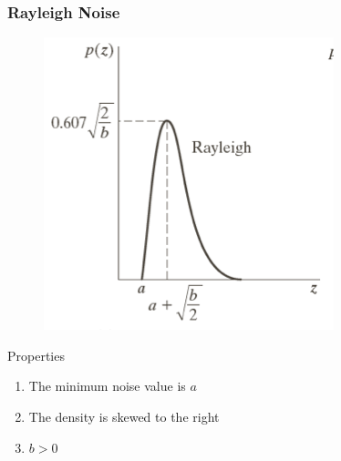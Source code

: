 \documentclass[english,11pt,table,handout]{beamer}
\begin{document}
\frame
{
	\frametitle{Rayleigh Noise}
	\begin{figure}[!h]
		\includegraphics[scale=1.0]{rayleigh_1d.png}
	\end{figure}
	
	\begin{alertblock}{Properties}
		\begin{enumerate}
			\item The minimum noise value is $a$
			\item The density is skewed to the right
			\item $b > 0$
		\end{enumerate}
	\end{alertblock}
}
\end{document}
